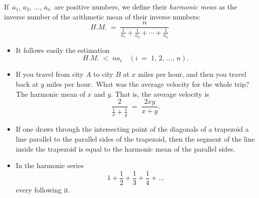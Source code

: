 \documentclass[12pt]{article}
\begin{document}
If\, $a_1,\,a_2,\,\ldots,\,a_n$\, are positive numbers, we define their \emph{harmonic mean} as the inverse number of the arithmetic mean of their inverse numbers:
$$H.M. \;=\; \frac{n}{\frac{1}{a_1}+\frac{1}{a_2}+\cdots+\frac{1}{a_n}}$$
\bigskip

\begin{itemize}

\item It follows easily the estimation
$$H.M. \;<\; na_i \quad (i \;=\; 1,\,2,\,\ldots,\,n).$$

\item If you travel from city $A$ to city $B$ at $x$ miles per hour, and then you travel back at $y$ miles per hour.\, What was the average velocity for the whole trip?\\
The harmonic mean of $x$ and $y$. That is, the average velocity is
$$\frac{2}{\frac{1}{x}+\frac{1}{y}} \;=\; \frac{2xy}{x\!+\!y}.$$

\item If one draws through the intersecting point of the diagonals of a trapezoid a line parallel to the parallel sides of the trapezoid, then the segment of the line inside the trapezoid is equal to the harmonic mean of the parallel sides.

\item In the harmonic series
$$1+\frac{1}{2}+\frac{1}{3}+\frac{1}{4}+...$$
every  following it.

\end{itemize}
\end{document}

